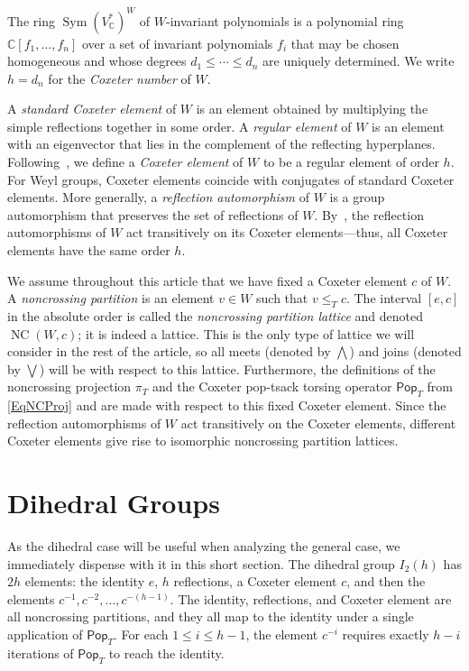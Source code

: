 \documentclass[10pt,a4paper]{amsart}
\newcommand{\darkblue}{\color{darkblue}}
\newcommand{\defn}[1]{\emph{\darkblue #1}}
\newcommand{\pop}{\mathsf{Pop}}
\DeclareMathOperator{\NC}{NC}
\DeclareMathOperator{\Sym}{Sym}
\begin{document}
The ring $\Sym(V_\mathbb{C}^*)^W$ of $W$-invariant polynomials is a polynomial ring $\mathbb{C}[f_1,\ldots,f_n]$ over a set of invariant polynomials $f_i$ that may be chosen homogeneous and whose degrees $d_1 \leq \cdots \leq d_n$ are uniquely determined.  We write $h=d_n$ for the \defn{Coxeter number} of $W$.

A \defn{standard Coxeter element} of $W$ is an element obtained by multiplying the simple reflections together in some order.  A \defn{regular element} of $W$ is an element with an eigenvector that lies in the complement of the reflecting hyperplanes.  Following~\cite{reiner2017non}, we define a \defn{Coxeter element} of $W$ to be a regular element of order $h$.  For Weyl groups, Coxeter elements coincide with conjugates of standard Coxeter elements.  
More generally, a \defn{reflection automorphism} of $W$ is a group automorphism that preserves the set of reflections of $W$.  By~\cite[Proposition~1.4]{reiner2017non}, the reflection automorphisms of $W$ act transitively on its Coxeter elements---thus, all Coxeter elements have the same order $h$.

We assume throughout this article that we have fixed a Coxeter element $c$ of $W$. A \defn{noncrossing partition} is an element $v\in W$ such that $v\leq_T c$. The interval $[e,c]$ in the absolute order is called the \defn{noncrossing partition lattice} and denoted $\NC(W,c)$; it is indeed a lattice. This is the only type
of lattice we will consider in the rest of the article, so all meets (denoted by $\bigwedge$) and joins (denoted by $\bigvee$) will be with respect to this lattice. Furthermore, the definitions of the noncrossing projection $\pi_T$ and the Coxeter pop-tsack torsing operator $\pop_T$ from \eqref{EqNCProj} and  are made with respect to this 
fixed Coxeter element. Since the reflection automorphisms of $W$ act transitively on the Coxeter elements, different Coxeter elements give rise to isomorphic noncrossing partition lattices.

\section{Dihedral Groups}
\label{sec:dihedral}

As the dihedral case will be useful when analyzing the general case, we immediately dispense with it in this short section.  The dihedral group $I_2(h)$ has $2h$ elements: the identity $e$, $h$ reflections, a Coxeter element $c$, and then the elements $c^{-1},c^{-2},\ldots,c^{-(h-1)}$.  The identity, reflections, and Coxeter element are all noncrossing partitions, and they all map to the identity under a single application of $\pop_T$.  For each $1\leq i\leq h-1$, the element $c^{-i}$ requires exactly $h-i$ iterations of $\pop_T$ to reach the identity.
\end{document}
